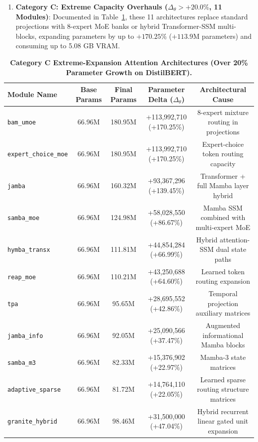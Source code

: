 \documentclass{article}
\begin{document}
\begin{enumerate}
    \item \textbf{Category C: Extreme Capacity Overhauls ($\Delta_\theta > +20.0\%$, 11 Modules)}:
    Documented in Table~\ref{tab:extreme_expansion}, these 11 architectures replace standard projections with 8-expert MoE banks or hybrid Transformer-SSM multi-blocks, expanding parameters by up to $+170.25\%$ ($+113.9\text{M}$ parameters) and consuming up to 5.08 GB VRAM.
\end{enumerate}

\begin{table}[ht]
\centering
\scriptsize
\setlength{\tabcolsep}{3.5pt}
\caption{\textbf{Category C Extreme-Expansion Attention Architectures (Over 20\% Parameter Growth on DistilBERT).}}
\label{tab:extreme_expansion}
\begin{tabular}{lcccc}
\toprule
\textbf{Module Name} & \textbf{Base Params} & \textbf{Final Params} & \textbf{Parameter Delta ($\Delta_\theta$)} & \textbf{Architectural Cause} \\
\midrule
\texttt{bam\_umoe} & 66.96M & 180.95M & +113,992,710 (+170.25\%) & 8-expert mixture routing in projections \\
\texttt{expert\_choice\_moe} & 66.96M & 180.95M & +113,992,710 (+170.25\%) & Expert-choice token routing capacity \\
\texttt{jamba} & 66.96M & 160.32M & +93,367,296 (+139.45\%) & Transformer + full Mamba layer hybrid \\
\texttt{samba\_moe} & 66.96M & 124.98M & +58,028,550 (+86.67\%) & Mamba SSM combined with multi-expert MoE \\
\texttt{hymba\_transx} & 66.96M & 111.81M & +44,854,284 (+66.99\%) & Hybrid attention-SSM dual state paths \\
\texttt{reap\_moe} & 66.96M & 110.21M & +43,250,688 (+64.60\%) & Learned token routing expansion \\
\texttt{tpa} & 66.96M & 95.65M & +28,695,552 (+42.86\%) & Temporal projection auxiliary matrices \\
\texttt{jamba\_info} & 66.96M & 92.05M & +25,090,566 (+37.47\%) & Augmented informational Mamba blocks \\
\texttt{samba\_m3} & 66.96M & 82.33M & +15,376,902 (+22.97\%) & Mamba-3 state matrices \\
\texttt{adaptive\_sparse} & 66.96M & 81.72M & +14,764,110 (+22.05\%) & Learned sparse routing structure matrices \\
\texttt{granite\_hybrid} & 66.96M & 98.46M & +31,500,000 (+47.04\%) & Hybrid recurrent linear gated unit expansion \\
\bottomrule
\end{tabular}
\end{table}
\end{document}

